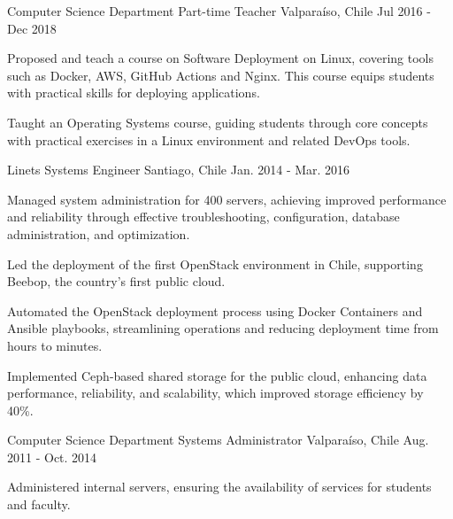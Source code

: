 \begin{cventries}
    \cventry
    {Computer Science Department}
    {Part-time Teacher}
    {Valparaíso, Chile}
    {Jul 2016 - Dec 2018}
    {
      \begin{cvitems}
        \item{Proposed and teach a course on Software Deployment on Linux, covering tools such as Docker, AWS, GitHub Actions and Nginx. This course equips students with practical skills for deploying applications.}
        \item{Taught an Operating Systems course, guiding students through core concepts with practical exercises in a Linux environment and related DevOps tools.}
      \end{cvitems}
    }


  \cventry
    {Linets}
    {Systems Engineer}
    {Santiago, Chile}
    {Jan. 2014 - Mar. 2016}
    {
      \begin{cvitems}
        \item{Managed system administration for 400 servers, achieving improved performance and reliability through effective troubleshooting, configuration, database administration, and optimization.}
        \item{Led the deployment of the first OpenStack environment in Chile, supporting Beebop, the country's first public cloud.}
        \item{Automated the OpenStack deployment process using Docker Containers and Ansible playbooks, streamlining operations and reducing deployment time from hours to minutes.}
        \item{Implemented Ceph-based shared storage for the public cloud, enhancing data performance, reliability, and scalability, which improved storage efficiency by 40\%.}
      \end{cvitems}
    }

  \cventry
    {Computer Science Department}
    {Systems Administrator}
    {Valparaíso, Chile}
    {Aug. 2011 - Oct. 2014}
    {
      \begin{cvitems}
        \item{Administered internal servers, ensuring the availability of services for students and faculty.}
      \end{cvitems}
    }
\end{cventries}
